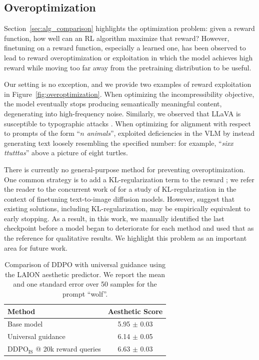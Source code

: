 \newpage
\begin{appendices}

\section{Overoptimization}
\label{app:overoptimization}



Section~\ref{sec:alg_comparison} highlights the optimization problem: given a reward function, how well can an RL algorithm maximize that reward?
However, finetuning on a reward function, especially a learned one, has been observed to lead to reward overoptimization or exploitation \citep{gao2022overoptimization} in which the model achieves high reward while moving too far away from the pretraining distribution to be useful.

Our setting is no exception, and we provide two examples of reward exploitation in Figure~\ref{fig:overoptimization}.
When optimizing the incompressibility objective, the model eventually stops producing semantically meaningful content, degenerating into high-frequency noise.
Similarly, we observed that LLaVA is susceptible to typographic attacks \citep{goh2021multimodal}.
When optimizing for alignment with respect to prompts of the form ``\emph{$n$ animals}'', \methodours{} exploited deficiencies in the VLM by instead generating text loosely resembling the specified number: for example, ``\emph{sixx ttutttas}'' above a picture of eight turtles.

There is currently no general-purpose method for preventing overoptimization.
One common strategy is to add a KL-regularization term to the reward \citep{ouyang2022instructgpt,stiennon2020feedback}; we refer the reader to the concurrent work of \citet{fan2023dpok} for a study of KL-regularization in the context of finetuning text-to-image diffusion models.
However, \citet{gao2022overoptimization} suggest that existing solutions, including KL-regularization, may be empirically equivalent to early stopping. As a result, in this work, we manually identified the last checkpoint before a model began to deteriorate for each method and used that as the reference for qualitative results.
We highlight this problem as an important area for future work.

\begin{table}[b]
    \centering
    \begin{tabular}{l|c}
        Method & Aesthetic Score \\
        \midrule
        Base model & 5.95 $\pm$ 0.03 \\
        Universal guidance & 6.14 $\pm$ 0.05 \\
        $\text{DDPO}_{\text{IS}}$ @ 20k reward queries & 6.63 $\pm$ 0.03
    \end{tabular}
    \caption{Comparison of DDPO with universal guidance using the LAION aesthetic predictor. We report the mean and one standard error over 50 samples for the prompt ``wolf''.}
    \label{tab:universal_guidance}
\end{table}


\end{appendices}
